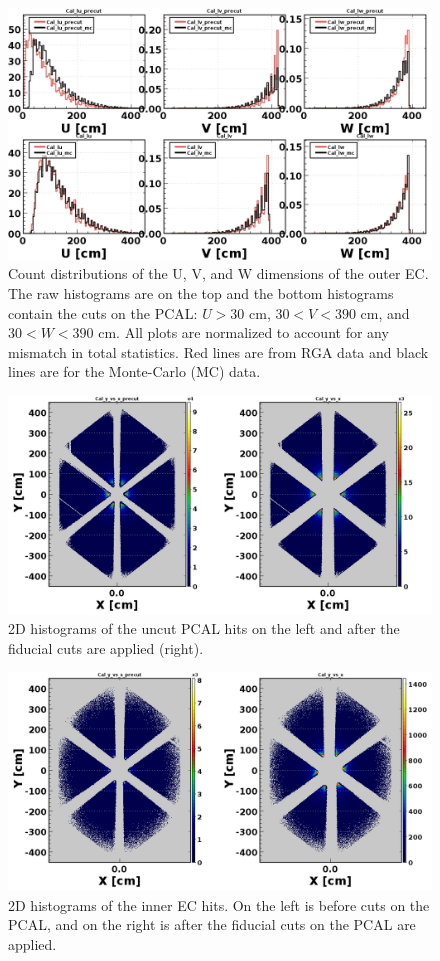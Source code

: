 \begin{figure}[H]
	\centering
	\includegraphics[width=0.9\linewidth]{figures/rga/1d_ecal_ECout.png}
	\caption{Count distributions of the U, V, and W dimensions of the outer EC. The raw histograms are on the top and the bottom histograms contain the cuts on the PCAL: $U>30$ cm, $30<V<390$ cm, and $30<W<390$ cm. All plots are normalized to account for any mismatch in total statistics. Red lines are from RGA data and black lines are for the Monte-Carlo (MC) data.}
	\label{fig:rga_1decal_ecout}
\end{figure}

\begin{figure}[H]
	\centering
	\includegraphics[width=0.9\linewidth]{figures/rga/2d_ecal.png}
	\caption{2D histograms of the uncut PCAL hits on the left and after the fiducial cuts are applied (right).}
	\label{fig:rga_2decal}
\end{figure}

\begin{figure}[H]
	\centering
	\includegraphics[width=0.9\linewidth]{figures/rga/2d_ecal_ECIN.png}
	\caption{2D histograms of the inner EC hits. On the left is before cuts on the PCAL, and on the right is after the fiducial cuts on the PCAL are applied.}
	\label{fig:rga_2decal_ecin}
\end{figure}

